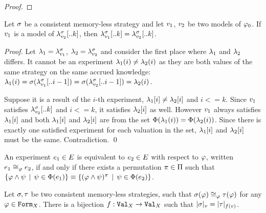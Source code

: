 \begin{proof}
\end{proof}

\begin{lemma} \label{lma-accruedknowledge}
Let $\sigma$ be a consistent memory-less strategy and let $v_1$, $v_2$ be two models of $\varphi_0$.
If $v_1$ is a model of $\lambda^{\sigma}_{v_2}[..k]$, then $\lambda^{\sigma}_{v_1}[..k] = \lambda^{\sigma}_{v_2}[..k]$.
\end{lemma}

\begin{proof}
Let $\lambda_1 = \lambda^{\sigma}_{v_1}$, $\lambda_2 = \lambda^{\sigma}_{v_2}$
and consider the first place where $\lambda_1$ and $\lambda_2$ differs.
It cannot be an experiment $\lambda_1(i) \not= \lambda_2(i)$ as they are both
  values of the same strategy on the same accrued knowledge:
$\lambda_1(i) = \sigma(\lambda^{\sigma}_{v_1}[..i-1]) =
              \sigma(\lambda^{\sigma}_{v_2}[..i-1]) = \lambda_2(i)$.

Suppose it is a result of the $i$-th experiment, $\lambda_1[i] \not= \lambda_2[i]$
  and $i <= k$.
Since $v_1$ satisfies $\lambda^{\sigma}_{v_2}[..k]$ and $i <= k$,
  it satisfies $\lambda_2[i]$ as well.
However $v_1$ always satisfies $\lambda_1[i]$ and
  both $\lambda_1[i]$ and $\lambda_2[i]$ are from the set
  $\Phi(\lambda_1(i)) = \Phi(\lambda_2(i))$.
Since there is exactly one satisfied experiment for each valuation in the set,
  $\lambda_1[i]$ and $\lambda_2[i]$ must be the same.
Contradiction. \qed
\end{proof}

\begin{definition}
An experiment $e_1\in E$ is equivalent to $e_2\in E$ with respect to $\varphi$,
  written $e_1\cong_{\varphi}e_2$,
  if and only if there exists a permutation $\pi\in\Pi$ such that %
 $ \{ \varphi\wedge\psi \:\:|\:\: \psi\in\Phi(e_1) \} \equiv
   \{ (\varphi\wedge\psi)^\pi \:\:|\:\: \psi\in\Phi(e_2) \} $.
\end{definition}

\begin{theorem}
Let $\sigma, \tau$ be two consistent memory-less strategies, such that
$\sigma(\varphi) \cong_{\varphi} \tau(\varphi)$ for any $\varphi\in\mathtt{Form}_X$.
There is a bijection $f:\mathtt{Val}_X -> \mathtt{Val}_X$ such that
$|\sigma|_{v} = |\tau|_{f(v)}$.
\end{theorem}

